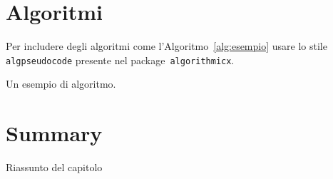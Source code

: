 \section{Algoritmi}
Per includere degli algoritmi come l'Algoritmo~\ref{alg:esempio}
usare lo stile \texttt{algpseudocode} presente nel package~\texttt{algorithmicx}.

\begin{algorithm}[t]
  
  \caption{Un esempio di algoritmo.}
  \label{alg:esempio}
\end{algorithm}


\section{Summary}

Riassunto del capitolo